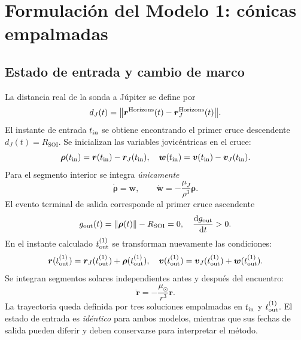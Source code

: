 \documentclass[11pt,a4paper]{article}
\newcommand{\vect}[1]{\bm{#1}}
\newcommand{\dif}{\mathop{}\!\mathrm{d}}
\newcommand{\SOI}{R_{\mathrm{SOI}}}
\newcommand{\muS}{\mu_\odot}
\newcommand{\muJ}{\mu_{J}}
\newcommand{\rJ}{\vect r_{J}}
\newcommand{\vJ}{\vect v_{J}}
\newcommand{\rV}{\vect r}
\newcommand{\vV}{\vect v}
\begin{document}
\section{Formulación del Modelo 1: cónicas empalmadas}
\subsection{Estado de entrada y cambio de marco}
La distancia real de la sonda a Júpiter se define por
\begin{equation}
d_J(t)=\bigl\lVert\rV^{\rm Horizons}(t)-\rJ^{\rm Horizons}(t)\bigr\rVert.
\end{equation}
El instante de entrada $t_{\rm in}$ se obtiene encontrando el primer cruce descendente $d_J(t)=\SOI$. Se inicializan las variables jovicéntricas en el cruce:
\begin{equation}\label{eq:entry}
\vect\rho(t_{\rm in})=\rV(t_{\rm in})-\rJ(t_{\rm in}),
\quad \vect w(t_{\rm in})=\vV(t_{\rm in})-\vJ(t_{\rm in}).
\end{equation}
Para el segmento interior se integra \emph{únicamente}
\begin{equation}\label{eq:model1}
\dot{\vect\rho}=\vect w,
\qquad
\dot{\vect w}=-\frac{\muJ}{\rho^3}\vect\rho.
\end{equation}
El evento terminal de salida corresponde al primer cruce ascendente
\begin{equation}
g_{\rm out}(t)=\lVert\vect\rho(t)\rVert-\SOI=0,
\quad \frac{\dif g_{\rm out}}{\dif t}>0.
\end{equation}
En el instante calculado $t_{\rm out}^{(1)}$ se transforman nuevamente las condiciones:
\begin{equation}\label{eq:exit}
\rV(t_{\rm out}^{(1)})=\rJ(t_{\rm out}^{(1)})+\vect\rho(t_{\rm out}^{(1)}),
\quad
\vV(t_{\rm out}^{(1)})=\vJ(t_{\rm out}^{(1)})+\vect w(t_{\rm out}^{(1)}).
\end{equation}
Se integran segmentos solares independientes antes y después del encuentro:
\begin{equation}
\ddot{\rV}=-\frac{\muS}{r^3}\rV.
\end{equation}
La trayectoria queda definida por tres soluciones empalmadas en $t_{\rm in}$ y $t_{\rm out}^{(1)}$. El estado de entrada es \emph{idéntico} para ambos modelos, mientras que sus fechas de salida pueden diferir y deben conservarse para interpretar el método.
\end{document}

